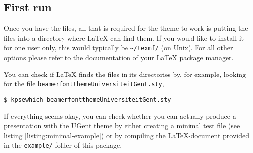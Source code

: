 \documentclass[a4paper,10pt]{article}
\newtheorem{note}{Note}
\newlength{\figurewidth}
\begin{document}
\subsection{First run}
Once you have the files, all that is required for the theme to work is putting the files into a directory where \LaTeX{} can find them. If you would like to install it for one user only, this would typically be \lstinline{~/texmf/} (on Unix). For all other options please refer to the documentation of your \LaTeX{} package manager.

You can check if \LaTeX{} finds the files in its directories by, for example, looking for the file \lstinline!beamerfontthemeUniversiteitGent.sty!,
\begin{lstlisting}
$ kpsewhich beamerfontthemeUniversiteitGent.sty
\end{lstlisting}

If everything seems okay, you can check whether you can actually produce a presentation with the UGent theme by either creating a minimal test file (see listing \ref{listing:minimal-example}) or by compiling the \LaTeX-document provided in the \lstinline!example/! folder of this package. 


%
%
%
%
%
%
%
%
%
%
%
%
%
%
\end{document}
